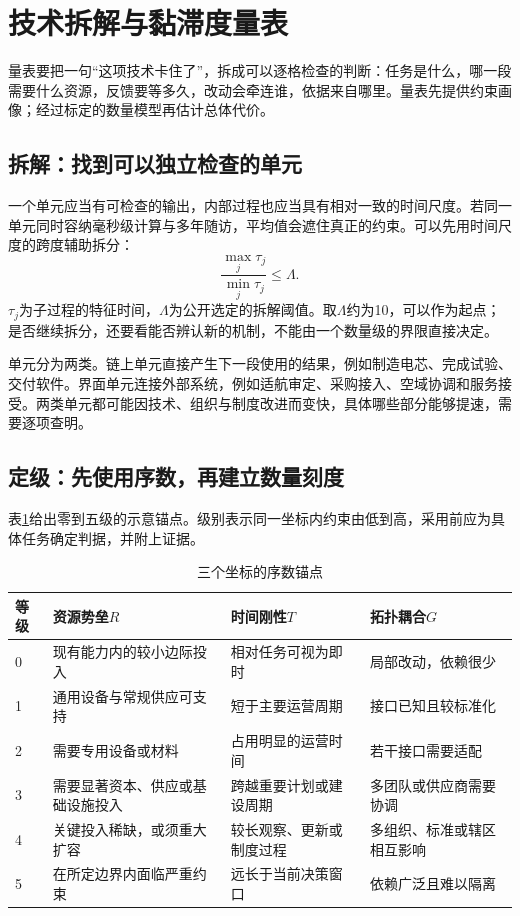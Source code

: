 \section{技术拆解与黏滞度量表}

量表要把一句“这项技术卡住了”，拆成可以逐格检查的判断：任务是什么，哪一段需要什么资源，反馈要等多久，改动会牵连谁，依据来自哪里。量表先提供约束画像；经过标定的数量模型再估计总体代价。

\subsection{拆解：找到可以独立检查的单元}

一个单元应当有可检查的输出，内部过程也应当具有相对一致的时间尺度。若同一单元同时容纳毫秒级计算与多年随访，平均值会遮住真正的约束。可以先用时间尺度的跨度辅助拆分：
\begin{equation}
\frac{\max_j\tau_j}{\min_j\tau_j}\leq\Lambda .
\label{eq:scale-lambda}
\end{equation}
$\tau_j$为子过程的特征时间，$\Lambda$为公开选定的拆解阈值。取$\Lambda$约为10，可以作为起点；是否继续拆分，还要看能否辨认新的机制，不能由一个数量级的界限直接决定。

单元分为两类。链上单元直接产生下一段使用的结果，例如制造电芯、完成试验、交付软件。界面单元连接外部系统，例如适航审定、采购接入、空域协调和服务接受。两类单元都可能因技术、组织与制度改进而变快，具体哪些部分能够提速，需要逐项查明。

\subsection{定级：先使用序数，再建立数量刻度}

表\ref{tab:scale-anchors}给出零到五级的示意锚点。级别表示同一坐标内约束由低到高，采用前应为具体任务确定判据，并附上证据。

\begin{table}[ht]
\centering
\caption{三个坐标的序数锚点}
\label{tab:scale-anchors}
{\small
\begin{tabularx}{\textwidth}{@{}lXXX@{}}
\toprule
等级 & 资源势垒$R$ & 时间刚性$T$ & 拓扑耦合$G$\\
\midrule
0 & 现有能力内的较小边际投入 & 相对任务可视为即时 & 局部改动，依赖很少\\
1 & 通用设备与常规供应可支持 & 短于主要运营周期 & 接口已知且较标准化\\
2 & 需要专用设备或材料 & 占用明显的运营时间 & 若干接口需要适配\\
3 & 需要显著资本、供应或基础设施投入 & 跨越重要计划或建设周期 & 多团队或供应商需要协调\\
4 & 关键投入稀缺，或须重大扩容 & 较长观察、更新或制度过程 & 多组织、标准或辖区相互影响\\
5 & 在所定边界内面临严重约束 & 远长于当前决策窗口 & 依赖广泛且难以隔离\\
\bottomrule
\end{tabularx}}
\end{table}


